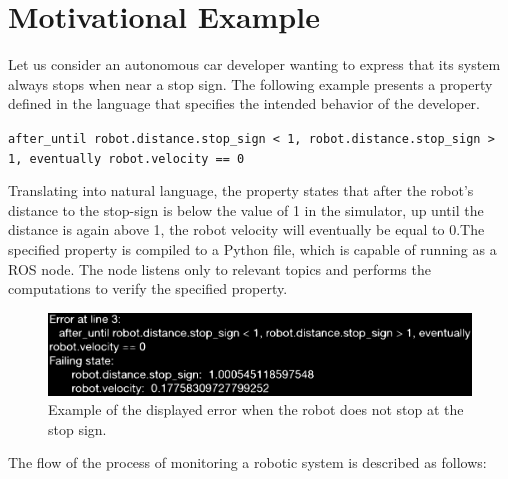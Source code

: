 \documentclass[runningheads]{llncs}
\begin{document}

\section{Motivational Example}

Let us consider an autonomous car developer wanting to express that its system always stops when near a stop sign. The following example presents a property defined in the language that specifies the intended behavior of the developer.


\vspace{3mm}
\texttt{after\_until robot.distance.stop\_sign < 1, robot.distance.stop\_sign > 1, eventually robot.velocity == 0}
\vspace{3mm}


Translating into natural language, the property states that after the robot's distance to the stop-sign is below the value of 1 in the simulator, up until the distance is again above 1, the robot velocity will eventually be equal to 0.The specified property is compiled to a Python file, which is capable of running as a ROS node. The node listens only to relevant topics and performs the computations to verify the specified property.

\begin{figure}
\includegraphics[width=\textwidth]{error.eps}
\caption{Example of the displayed error when the robot does not stop at the stop sign.} \label{fig1}
\end{figure}

The flow of the process of monitoring a robotic system is described as follows:
\end{document}
